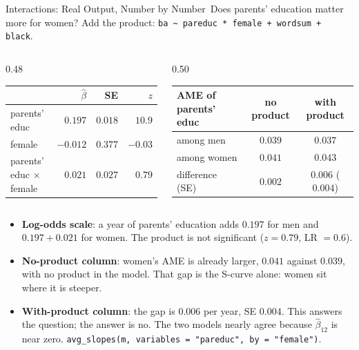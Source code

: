 \documentclass[aspectratio=169,11pt,xcolor=dvipsnames]{beamer}
\newcommand{\core}{\,\raisebox{0.6pt}{\textcolor{corestar}{$\bigstar$}}}
\begin{document}
\begin{frame}{Interactions: Real Output, Number by Number\core}
Does parents' education matter more for women? Add the product:
\texttt{ba \~{} pareduc * female + wordsum + black}.
\begin{columns}[c]
\begin{column}{0.48\textwidth}
\centering\scriptsize
\renewcommand{\arraystretch}{1.0}\setlength{\tabcolsep}{3pt}
\begin{tabular}{lrrr}
\toprule
 & $\hat\beta$ & SE & $z$ \\
\midrule
parents' educ & $0.197$ & $0.018$ & $10.9$ \\
female & $-0.012$ & $0.377$ & $-0.03$ \\
parents' educ $\times$ female & $0.021$ & $0.027$ & $0.79$ \\
\bottomrule
\end{tabular}
\end{column}
\begin{column}{0.50\textwidth}
\centering\scriptsize
\renewcommand{\arraystretch}{1.0}\setlength{\tabcolsep}{3pt}
\begin{tabular}{lcc}
\toprule
AME of parents' educ & no product & with product \\
\midrule
among men & $0.039$ & $0.037$ \\
among women & $0.041$ & $0.043$ \\
difference (SE) & $0.002$ & $0.006$ ($0.004$) \\
\bottomrule
\end{tabular}
\end{column}
\end{columns}
\vskip3pt
\begin{itemize}\itemsep2pt
  \item \textbf{Log-odds scale}: a year of parents' education adds
        $0.197$ for men and $0.197 + 0.021$ for women. The product is not
        significant ($z = 0.79$, LR $= 0.6$).
  \item \textbf{No-product column}: women's AME is already larger,
        $0.041$ against $0.039$, with no product in the model. That gap
        is the S-curve alone: women sit where it is steeper.
  \item \textbf{With-product column}: the gap is $0.006$ per year, SE
        $0.004$. This answers the question; the answer is no. The two
        models nearly agree because $\hat\beta_{12}$ is near zero.
        \texttt{avg\_slopes(m, variables = "pareduc", by = "female")}.
\end{itemize}
\end{frame}
\end{document}

